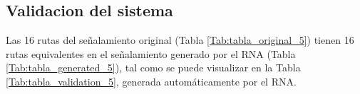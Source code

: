 \subsection{Validacion del sistema}

    Las 16 rutas del señalamiento original (Tabla \ref{Tab:tabla_original_5}) tienen 16 rutas equivalentes en el señalamiento generado por el RNA (Tabla \ref{Tab:tabla_generated_5}), tal como se puede visualizar en la Tabla \ref{Tab:tabla_validation_5}, generada automáticamente por el RNA.

    \begin{table}[H]
        {
        \caption{Equivalencias entre las rutas originales y las generadas por el RNA.}
        \label{Tab:tabla_validation_5}
        \centering
            \begin{center}
\end{center}}
\end{table}
